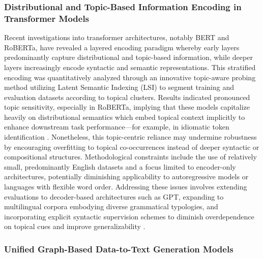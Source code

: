 \documentclass[sigconf]{acmart}
\begin{document}
\subsubsection{Distributional and Topic-Based Information Encoding in Transformer Models}

Recent investigations into transformer architectures, notably BERT and RoBERTa, have revealed a layered encoding paradigm whereby early layers predominantly capture distributional and topic-based information, while deeper layers increasingly encode syntactic and semantic representations. This stratified encoding was quantitatively analyzed through an innovative topic-aware probing method utilizing Latent Semantic Indexing (LSI) to segment training and evaluation datasets according to topical clusters. Results indicated pronounced topic sensitivity, especially in RoBERTa, implying that these models capitalize heavily on distributional semantics which embed topical context implicitly to enhance downstream task performance---for example, in idiomatic token identification \cite{ref44}. Nonetheless, this topic-centric reliance may undermine robustness by encouraging overfitting to topical co-occurrences instead of deeper syntactic or compositional structures. Methodological constraints include the use of relatively small, predominantly English datasets and a focus limited to encoder-only architectures, potentially diminishing applicability to autoregressive models or languages with flexible word order. Addressing these issues involves extending evaluations to decoder-based architectures such as GPT, expanding to multilingual corpora embodying diverse grammatical typologies, and incorporating explicit syntactic supervision schemes to diminish overdependence on topical cues and improve generalizability \cite{ref44}.

\subsubsection{Unified Graph-Based Data-to-Text Generation Models}
\end{document}
